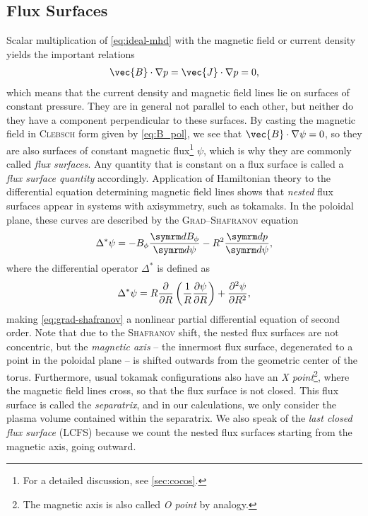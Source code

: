\subsection{Flux Surfaces}

Scalar multiplication of \cref{eq:ideal-mhd} with the magnetic field or current density yields the important relations
\begin{gather}
  \vec{B} \cdot \grad p = \vec{J} \cdot \grad p = 0,
\end{gather}
which means that the current density and magnetic field lines lie on surfaces of constant pressure. They are in general not parallel to each other, but neither do they have a component perpendicular to these surfaces. By casting the magnetic field in \textsc{Clebsch} form given by \cref{eq:B_pol}, we see that $\vec{B} \cdot \grad \psi = 0$, so they are also surfaces of constant magnetic flux\footnote{For a detailed discussion, see \cref{sec:cocos}.} $\psi$, which is why they are commonly called \emph{flux surfaces}. Any quantity that is constant on a flux surface is called a \emph{flux surface quantity} accordingly. Application of Hamiltonian theory to the differential equation determining magnetic field lines shows that \emph{nested} flux surfaces appear in systems with axisymmetry, such as tokamaks. In the poloidal plane, these curves are described by the \textsc{Grad}--\textsc{Shafranov} equation
\begin{gather}
  \Delta^{*} \psi = -B_{\phi} \frac{\diff B_{\phi}}{\diff \psi} - R^{2} \frac{\diff p}{\diff \psi}, \label{eq:grad-shafranov}
\end{gather}
where the differential operator $\Delta^{*}$ is defined as
\begin{gather}
  \Delta^{*} \psi = R \pd{R} \left ( \frac{1}{R} \pd[\psi]{R} \right ) + \frac{\partial^{2} \psi}{\partial R^{2}},
\end{gather}
making \cref{eq:grad-shafranov} a nonlinear partial differential equation of second order. Note that due to the \textsc{Shafranov} shift, the nested flux surfaces are not concentric, but the \emph{magnetic axis} -- the innermost flux surface, degenerated to a point in the poloidal plane -- is shifted outwards from the geometric center of the torus. Furthermore, usual tokamak configurations also have an \emph{X point}\footnote{The magnetic axis is also called \emph{O point} by analogy.}, where the magnetic field lines cross, so that the flux surface is not closed. This flux surface is called the \emph{separatrix}, and in our calculations, we only consider the plasma volume contained within the separatrix. We also speak of the \emph{last closed flux surface} (LCFS) because we count the nested flux surfaces starting from the magnetic axis, going outward.

